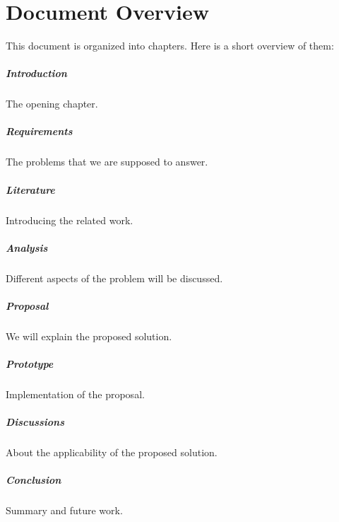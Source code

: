 \section{Document Overview}
This document is organized into  chapters. Here is a short overview of them:
\subparagraph{Introduction} The opening chapter.
\subparagraph{Requirements} The problems that we are supposed to answer.
\subparagraph{Literature} Introducing the related work.
\subparagraph{Analysis} Different aspects of the problem will be discussed.
\subparagraph{Proposal} We will explain the proposed solution.
\subparagraph{Prototype} Implementation of the proposal.
\subparagraph{Discussions} About the applicability of the proposed solution.
\subparagraph{Conclusion} Summary and future work.